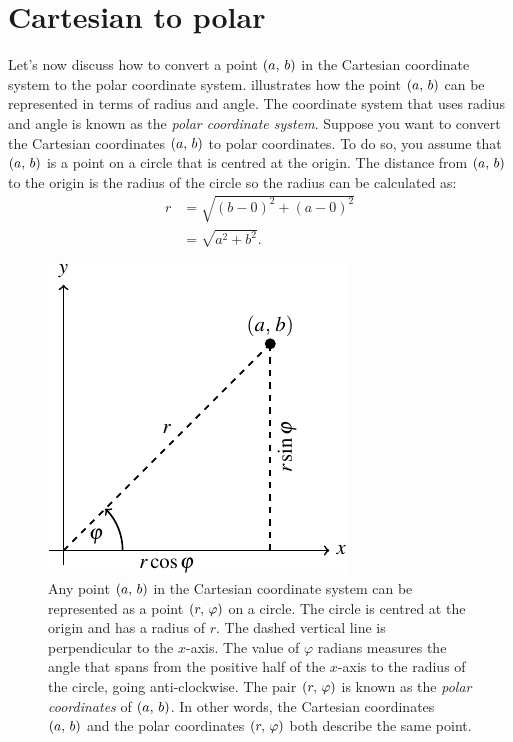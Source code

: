 \documentclass[a4paper,oneside,12pt]{article}
\begin{document}

\section{Cartesian to polar}

Let's now discuss how to convert a point $\left\lparen{a},\, {b}\right\rparen$ in the
Cartesian coordinate system to the polar coordinate system.
 illustrates
how the point $\left\lparen{a},\, {b}\right\rparen$ can be represented in terms of radius and
angle.  The coordinate system that uses radius and angle is known as
the \emph{polar coordinate system}.  Suppose you want to convert the
Cartesian coordinates $\left\lparen{a},\, {b}\right\rparen$ to polar coordinates.  To do so,
you assume that $\left\lparen{a},\, {b}\right\rparen$ is a point on a circle that is centred
at the origin.  The distance from $\left\lparen{a},\, {b}\right\rparen$ to the origin is the
radius of the circle so the radius can be calculated as:
\begin{align*}
r
&=
\sqrt{
  (b - 0)^2 + (a - 0)^2
} \\[4pt]
&=
\sqrt{
  a^2 + b^2
}.
\end{align*}

\begin{figure}[!htbp]
\centering
\includegraphics[scale=1.1]{image/04/polar-cartesian.pdf}
\caption{%
  Any point $\left\lparen{a},\, {b}\right\rparen$ in the Cartesian coordinate system can be
  represented as a point $\left\lparen{r},\, {\varphi}\right\rparen$ on a circle.  The circle
  is centred at the origin and has a radius of $r$.  The dashed
  vertical line is perpendicular to the $x$-axis.  The value of
  $\varphi$ radians measures the angle that spans from the positive
  half of the $x$-axis to the radius of the circle, going
  anti-clockwise.  The pair $\left\lparen{r},\, {\varphi}\right\rparen$ is known as the
  \emph{polar coordinates} of $\left\lparen{a},\, {b}\right\rparen$.  In other words, the
  Cartesian coordinates $\left\lparen{a},\, {b}\right\rparen$ and the polar coordinates
  $\left\lparen{r},\, {\varphi}\right\rparen$ both describe the same point.
}
\label{fig:convert_from_polar_to_Cartesian_coordinates}
\end{figure}
\end{document}
